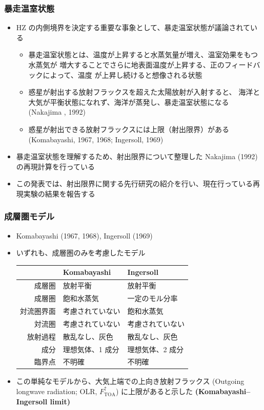 \documentclass[aspectratio=149]{beamer}
\newcommand{\hmemph}[1]{\textbf{#1}}
\newcommand{\hmTOA}{\mathrm{TOA}}
\begin{document}
\begin{frame}
	\frametitle{暴走温室状態}
	\begin{itemize}
		\item HZ の内側境界を決定する重要な事象として、暴走温室状態が議論されている
			\begin{itemize}
				\item 暴走温室状態とは、温度が上昇すると水蒸気量が増え、温室効果をもつ水蒸気が
					増大することでさらに地表面温度が上昇する、正のフィードバックによって、温度
					が上昇し続けると想像される状態
				\item 惑星が射出する放射フラックスを超えた太陽放射が入射すると、
					海洋と大気が平衡状態になれず、海洋が蒸発し、暴走温室状態になる
					(Nakajima \etal*, 1992)
				\item 惑星が射出できる放射フラックスには上限（射出限界）がある
					(Komabayashi, 1967, 1968; Ingersoll, 1969)
			\end{itemize}
		\item 暴走温室状態を理解するため、射出限界について整理した Nakajima \etal (1992) の再現計算を行っている
		\item この発表では、射出限界に関する先行研究の紹介を行い、現在行っている再現実験の結果を報告する
	\end{itemize}
\end{frame}

\begin{frame}
	\frametitle{成層圏モデル}
	\begin{itemize}
		\item Komabayashi (1967, 1968), Ingersoll (1969)
		\item いずれも、成層圏のみを考慮したモデル
			\begin{table}
				\centering\small
				\begin{tabular}{rll}
					\hline
					 &Komabayashi&Ingersoll\\
					 \hline
					成層圏&放射平衡&放射平衡\\
					成層圏&飽和水蒸気&一定のモル分率\\
					対流圏界面&考慮されていない&飽和水蒸気\\
					対流圏&考慮されていない&考慮されていない\\
					放射過程&散乱なし、灰色&散乱なし、灰色\\
					成分&理想気体、1 成分&理想気体、2 成分\\
					臨界点&不明確&不明確\\
					\hline
				\end{tabular}
			\end{table}
		\item この単純なモデルから、大気上端での上向き放射フラックス
			(Outgoing longwave radiation; OLR, \(F^\uparrow_\hmTOA\))
			に上限があると示した \hmemph{(Komabayashi--Ingersoll limit)}
	\end{itemize}
\end{frame}
\end{document}
